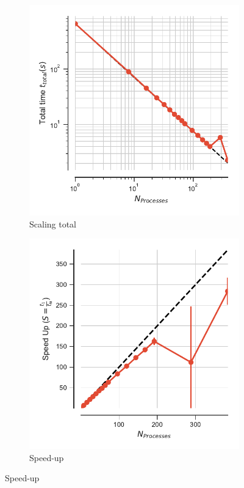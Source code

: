 \begin{figure}[ht!]
\centering
\begin{subfigure}{.4\textwidth}
  \includegraphics[width=\linewidth]{figures/hdf5-t_total.pdf}
  \caption{Scaling total}
  \label{fig:MPIscaling-hdf5}
\end{subfigure}
\hfill
\begin{subfigure}{.4\textwidth}
  \includegraphics[width=\linewidth]{figures/hdf5-speed_up.pdf}
  \caption{Speed-up}
  \label{fig:MPIspeedup-hdf5}
\end{subfigure}
\bigskip


\end{figure}
